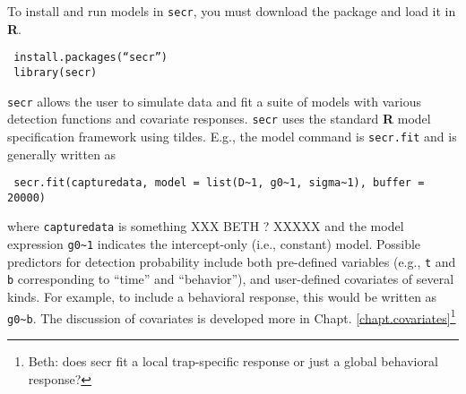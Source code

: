 To install
and run models in \mbox{\tt secr}, you must download the package and
load it in
{\bf R}.
\begin{verbatim}
 install.packages(“secr”)
 library(secr)
\end{verbatim}
\mbox{\tt secr} allows the user to simulate data and fit a suite of models with
various detection functions and covariate responses.  \mbox{\tt secr}
uses the
standard {\bf R} model specification framework using tildes. E.g., the model
command is \mbox{\tt secr.fit} and is generally written as
\begin{verbatim}
 secr.fit(capturedata, model = list(D~1, g0~1, sigma~1), buffer = 20000)
\end{verbatim}
where \mbox{\tt capturedata} is something XXX BETH ? XXXXX and
the model expression \verb#g0~1# indicates the intercept-only (i.e., constant) model. 
 Possible predictors for detection probability include both
pre-defined variables (e.g., \mbox{\tt t} and \mbox{\tt b}
corresponding to ``time'' and 
``behavior''), and user-defined covariates of several kinds. 
For example, to include a behavioral response, this would be written
as \verb#g0~b#.
The discussion of covariates is developed more in Chapt. \ref{chapt.covariates}\footnote{Beth:
  does secr fit a local trap-specific response or just a global
  behavioral response?}

